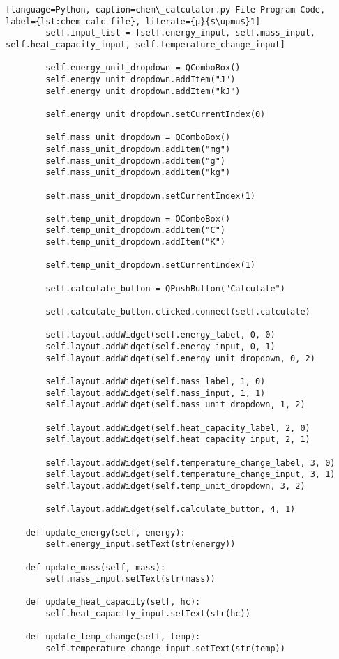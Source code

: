 \begin{lstlisting}[language=Python, caption=chem\_calculator.py File Program Code, label={lst:chem_calc_file}, literate={μ}{$\upmu$}1]
        self.input_list = [self.energy_input, self.mass_input, self.heat_capacity_input, self.temperature_change_input]

        self.energy_unit_dropdown = QComboBox()
        self.energy_unit_dropdown.addItem("J")
        self.energy_unit_dropdown.addItem("kJ")

        self.energy_unit_dropdown.setCurrentIndex(0)

        self.mass_unit_dropdown = QComboBox()
        self.mass_unit_dropdown.addItem("mg")
        self.mass_unit_dropdown.addItem("g")
        self.mass_unit_dropdown.addItem("kg")

        self.mass_unit_dropdown.setCurrentIndex(1)

        self.temp_unit_dropdown = QComboBox()
        self.temp_unit_dropdown.addItem("C")
        self.temp_unit_dropdown.addItem("K")

        self.temp_unit_dropdown.setCurrentIndex(1)

        self.calculate_button = QPushButton("Calculate")

        self.calculate_button.clicked.connect(self.calculate)

        self.layout.addWidget(self.energy_label, 0, 0)
        self.layout.addWidget(self.energy_input, 0, 1)
        self.layout.addWidget(self.energy_unit_dropdown, 0, 2)

        self.layout.addWidget(self.mass_label, 1, 0)
        self.layout.addWidget(self.mass_input, 1, 1)
        self.layout.addWidget(self.mass_unit_dropdown, 1, 2)

        self.layout.addWidget(self.heat_capacity_label, 2, 0)
        self.layout.addWidget(self.heat_capacity_input, 2, 1)

        self.layout.addWidget(self.temperature_change_label, 3, 0)
        self.layout.addWidget(self.temperature_change_input, 3, 1)
        self.layout.addWidget(self.temp_unit_dropdown, 3, 2)

        self.layout.addWidget(self.calculate_button, 4, 1)

    def update_energy(self, energy):
        self.energy_input.setText(str(energy))

    def update_mass(self, mass):
        self.mass_input.setText(str(mass))

    def update_heat_capacity(self, hc):
        self.heat_capacity_input.setText(str(hc))

    def update_temp_change(self, temp):
        self.temperature_change_input.setText(str(temp))


\end{lstlisting}
